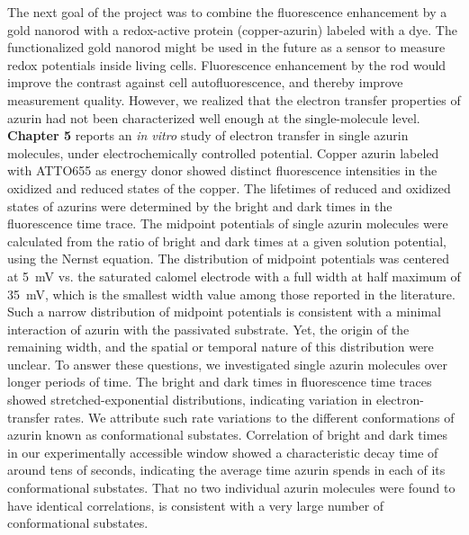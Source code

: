 The next goal of the project was to combine the fluorescence enhancement by a gold nanorod with a redox-active protein (copper-azurin) labeled with a dye.
The functionalized gold nanorod might be used in the future as a sensor to measure redox potentials inside living cells.
Fluorescence enhancement by the rod would improve the contrast against cell autofluorescence, and thereby improve measurement quality.
However, we realized that the electron transfer properties of azurin had not been characterized well enough at the single-molecule level.
\textbf{Chapter 5} reports an \textit{in vitro} study of electron transfer in single azurin molecules, under electrochemically controlled potential.
Copper azurin labeled with ATTO655 as energy donor showed distinct fluorescence intensities in the oxidized and reduced states of the copper.
The lifetimes of reduced and oxidized states of azurins were determined by the bright and dark times in the fluorescence time trace.
The midpoint potentials of single azurin molecules were calculated from the ratio of bright and dark times at a given solution potential, using the Nernst equation.
The distribution of midpoint potentials was centered at \SI{5}{\mV} vs. the saturated calomel electrode with a full width at half maximum of \SI{35}{\mV}, which is the smallest width value among those reported in the literature.
Such a narrow distribution of midpoint potentials is consistent with a minimal interaction of azurin with the passivated substrate.
Yet, the origin of the remaining width, and the spatial or temporal nature of this distribution were unclear.
To answer these questions, we investigated single azurin molecules over longer periods of time.
The bright and dark times in fluorescence time traces showed stretched-exponential distributions, indicating variation in electron-transfer rates.
We attribute such rate variations to the different conformations of azurin known as conformational substates.
Correlation of bright and dark times in our experimentally accessible window showed a characteristic decay time of around tens of seconds, indicating the average time azurin spends in each of its conformational substates.
That no two individual azurin molecules were found to have identical correlations, is consistent with a very large number of conformational substates.